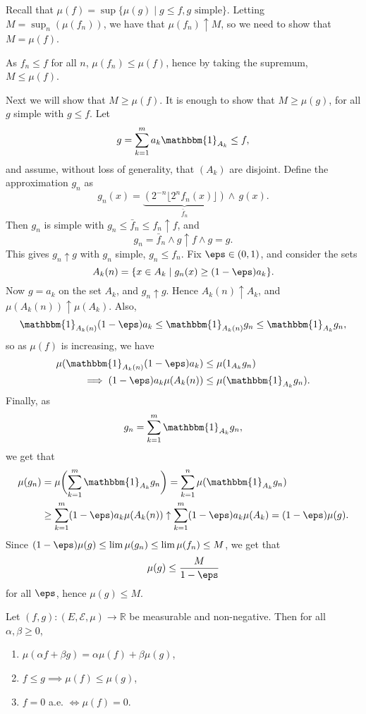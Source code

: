 \documentclass[12pt]{article}
\begin{document}
\begin{proofbox}
	Recall that $\mu(f) = \sup\{\mu(g) \mid g \leq f, g \text{ simple}\}$. Letting $M = \sup_n (\mu(f_n))$, we have that $\mu(f_n) \uparrow M$, so we need to show that $M = \mu(f)$.

	As $f_n \leq f$ for all $n$, $\mu(f_n) \leq \mu(f)$, hence by taking the supremum, $M \leq \mu(f)$.

	Next we will show that $M \ge \mu(f)$. It is enough to show that $M \geq \mu(g)$, for all $g$ simple with $g \leq f$. Let
	\[
	g = \sum_{k = 1}^{m} a_k \mathbbm{1}_{A_k} \leq f,
	\]
	and assume, without loss of generality, that $(A_k)$ are disjoint. Define the approximation $g_n$ as
	\[
		g_n(x) = \underbrace{(2^{-n} \lfloor 2^n f_n(x) \rfloor)}_{\bar f_n} \wedge\, g(x).
	\]
	Then $g_n$ is simple with $g_n \leq \bar f_n \leq f_n \uparrow f$, and
	\[
	g_n = \bar f_n \wedge g \uparrow f \wedge g = g.
	\]
	This gives $g_n \uparrow g$ with $g_n$ simple, $g_n \leq f_n$. Fix $\eps \in (0, 1)$, and consider the sets
	\[
		A_k(n) = \{x \in A_k \mid g_n(x) \geq (1-\eps)a_k\}.
	\]
	Now $g = a_k$ on the set $A_k$, and $g_n \uparrow g$. Hence $A_k(n) \uparrow A_k$, and $\mu(A_k(n)) \uparrow \mu(A_k)$. Also,
	\[
	\mathbbm{1}_{A_k(n)} (1 - \eps)a_k \leq \mathbbm{1}_{A_k(n)} g_n \leq \mathbbm{1}_{A_k} g_n,
	\]
	so as $\mu(f)$ is increasing, we have
	\begin{align*}
		\mu(\mathbbm{1}_{A_k(n)}(1-\eps)a_k) &\leq \mu(1_{A_k}g_n) \\
		\implies (1-\eps) a_k \mu(A_k(n)) &\leq \mu(\mathbbm{1}_{A_k}g_n).
	\end{align*}
	Finally, as
	\[
	g_n = \sum_{k = 1}^{m} \mathbbm{1}_{A_k}g_n,
	\]
	we get that
	\begin{align*}
		\mu(g_n) &= \mu \biggl( \sum_{k = 1}^{m} \mathbbm{1}_{A_k} g_n \biggr) = \sum_{k = 1}^{n} \mu(\mathbbm{1}_{A_k} g_n ) \\
			 &\geq \sum_{k = 1}^{m} (1 - \eps) a_k \mu(A_k(n)) \uparrow \sum_{k = 1}^{m} (1-\eps)a_k \mu(A_k) = (1-\eps) \mu(g).
	\end{align*}
	Since $(1 - \eps)\mu(g) \leq \lim \mu(g_n) \leq \lim \mu(f_n) \leq M$, we get that
	\[
	\mu(g) \leq \frac{M}{1 - \eps}
	\]
	for all $\eps$, hence $\mu(g) \leq M$.
\end{proofbox}

\begin{theorem}
	Let $(f, g) : (E, \mathcal{E}, \mu) \to \mathbb{R}$ be measurable and non-negative. Then for all $\alpha, \beta \geq 0$,
\begin{enumerate}[\normalfont(a)]
	\item $\mu(\alpha f + \beta g) = \alpha \mu(f) + \beta \mu(g)$,
	\item $f \leq g \implies \mu(f) \leq \mu(g)$,
	\item $f = 0$ a.e. $\iff \mu(f) = 0$.
\end{enumerate}
\end{theorem}
\end{document}
